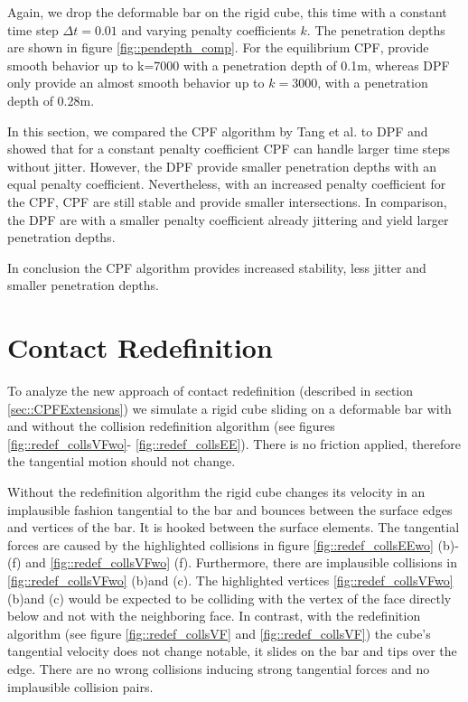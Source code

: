 Again, we drop the deformable bar on the rigid cube, this time with a constant time step $\Delta t=0.01$ and varying penalty coefficients $k$. The penetration depths are shown in figure \ref{fig::pendepth_comp}.
For the equilibrium CPF, provide smooth behavior up to k=7000 with a penetration depth of 0.1m, whereas DPF only provide an almost smooth behavior up to $k=3000$, with a penetration depth of 0.28m.



In this section, we compared the CPF algorithm by Tang et al. \cite{TANG2012} to DPF and showed that for a constant penalty coefficient CPF can handle larger time steps without jitter. However, the DPF provide smaller penetration depths with an equal penalty coefficient. Nevertheless, with an increased penalty coefficient for the CPF, CPF are still stable and provide smaller intersections. In comparison, the DPF are with a smaller penalty coefficient already jittering and yield larger penetration depths.

In conclusion the CPF algorithm provides increased stability, less jitter and smaller penetration depths.

\section{Contact Redefinition}
\label{sec::res_redef}
To analyze the new approach of contact redefinition (described in section \ref{sec::CPFExtensions}) we simulate a rigid cube sliding on a deformable bar with and without the collision redefinition algorithm (see figures \ref{fig::redef_collsVFwo}- \ref{fig::redef_collsEE}). There is no friction applied, therefore the tangential motion should not change.

Without the redefinition algorithm the rigid cube changes its velocity in an implausible fashion tangential to the bar and bounces between the surface edges and vertices of the bar. It is hooked between the surface elements. The tangential forces are caused by the highlighted collisions in figure \ref{fig::redef_collsEEwo} (b)-(f) and \ref{fig::redef_collsVFwo} (f). Furthermore, there are implausible collisions in \ref{fig::redef_collsVFwo} (b)and (c). The highlighted vertices  \ref{fig::redef_collsVFwo} (b)and (c) would be expected to be colliding with the vertex of the face directly below and not with the neighboring face.
In contrast, with the redefinition algorithm (see figure  \ref{fig::redef_collsVF} and \ref{fig::redef_collsVF}) the cube's tangential velocity does not change notable, it slides on the bar and tips over the edge. There are no wrong collisions inducing strong tangential forces and no implausible collision pairs.

